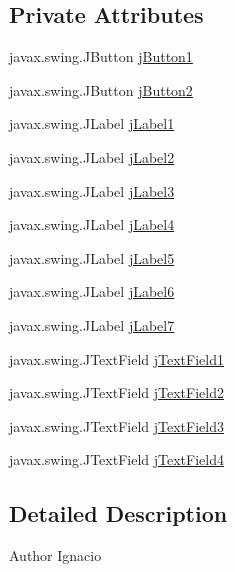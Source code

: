 \subsection*{Private Attributes}
\begin{DoxyCompactItemize}
\item 
javax.\+swing.\+J\+Button \mbox{\hyperlink{classsoftware_1_1ponernotas_ab5d7404242d2345a5e4b00f8816b4834}{j\+Button1}}
\item 
javax.\+swing.\+J\+Button \mbox{\hyperlink{classsoftware_1_1ponernotas_a5c280378d6fe6477170e9ede3ac8ae98}{j\+Button2}}
\item 
javax.\+swing.\+J\+Label \mbox{\hyperlink{classsoftware_1_1ponernotas_ac17144972e22b9105abd7154befd195a}{j\+Label1}}
\item 
javax.\+swing.\+J\+Label \mbox{\hyperlink{classsoftware_1_1ponernotas_ab381c20a9538313f7d4a5b39b0a96325}{j\+Label2}}
\item 
javax.\+swing.\+J\+Label \mbox{\hyperlink{classsoftware_1_1ponernotas_a35f1e77968f139680ed7404f94dada6f}{j\+Label3}}
\item 
javax.\+swing.\+J\+Label \mbox{\hyperlink{classsoftware_1_1ponernotas_a85fb8af1244048f39a9d8864e8ef6744}{j\+Label4}}
\item 
javax.\+swing.\+J\+Label \mbox{\hyperlink{classsoftware_1_1ponernotas_ab1d9cabe505eb0024a31ce142ab2ca0d}{j\+Label5}}
\item 
javax.\+swing.\+J\+Label \mbox{\hyperlink{classsoftware_1_1ponernotas_ac94bb41bd989a69788d89b0522ecba91}{j\+Label6}}
\item 
javax.\+swing.\+J\+Label \mbox{\hyperlink{classsoftware_1_1ponernotas_ae60c32ed6ba0e002b935d38c6d9378a3}{j\+Label7}}
\item 
javax.\+swing.\+J\+Text\+Field \mbox{\hyperlink{classsoftware_1_1ponernotas_a6ea3d65f0c7fddc1b3c983e9ed0e6939}{j\+Text\+Field1}}
\item 
javax.\+swing.\+J\+Text\+Field \mbox{\hyperlink{classsoftware_1_1ponernotas_a3cc94d5b5bd1181f042f71bcbe418e5f}{j\+Text\+Field2}}
\item 
javax.\+swing.\+J\+Text\+Field \mbox{\hyperlink{classsoftware_1_1ponernotas_a75f364eec0a40fc2d42d6387ea73baaf}{j\+Text\+Field3}}
\item 
javax.\+swing.\+J\+Text\+Field \mbox{\hyperlink{classsoftware_1_1ponernotas_a4939c719c7aae97334352b7c4d9fcbf2}{j\+Text\+Field4}}
\end{DoxyCompactItemize}


\subsection{Detailed Description}
\begin{DoxyAuthor}{Author}
Ignacio 
\end{DoxyAuthor}



